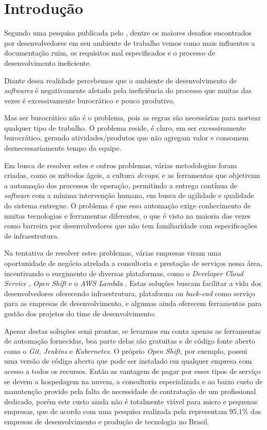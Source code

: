 \documentclass[
	12pt,				%
	openright,			%
	oneside,			%
	a4paper,			%
	english,			%
	french,				%
	spanish,			%
	brazil,				%
	]{abntex2}
\begin{document}
\chapter{Introdução}
Segundo uma pesquisa publicada pelo , dentre os maiores desafios encontrados por desenvolvedores em seu ambiente de trabalho vemos como mais influentes a documentação ruim, os requisitos mal especificados e o processo de desenvolvimento ineficiente.

Diante dessa realidade percebemos que o ambiente de desenvolvimento de \textit{softwares} é negativamente afetado pela ineficiência do processo que muitas das vezes é excessivamente burocrático e pouco produtivo.

\begin{citacao}
Mas ser burocrático não é o problema, pois as regras são necessárias para nortear qualquer tipo de trabalho. O problema reside, é claro, em ser excessivamente burocrático, gerando atividades/produtos que não agregam valor e consomem desnecessariamente tempo da equipe. \cite{EBusiness:ManifestoAgil}
\end{citacao}

Em busca de resolver estes e outros problemas, várias metodologias foram criadas, como os métodos ágeis, a cultura \textit{devops}, e as ferramentas que objetivam a automação dos processos de operação, permitindo a entrega contínua de \textit{software} com a mínima intervenção humana, em busca de agilidade e qualidade do sistema entregue. O problema é que essa automação exige conhecimento de muitas tecnologias e ferramentas diferentes, o que é visto na maioria das vezes como barreira por desenvolvedores que não tem familiaridade com especificações de infraestrutura.

Na tentativa de resolver estes problemas, várias empresas viram uma oportunidade de negócio atrelada a consultoria e prestação de serviços nessa área, incentivando o surgimento de diversas plataformas, como o \textit{Developer Cloud Service} \cite{Oracle:DevOps}, \textit{Open Shift} \cite{RedHat:OpenShift} e o \textit{AWS Lambda} \cite{Amazon:Lambda}. Estas soluções buscam facilitar a vida dos desenvolvedores oferecendo infraestrutura, plataforma ou \textit{back-end} como serviço para as empresas de desenvolvimento, e algumas ainda oferecem ferramentas para gestão dos projetos do time de desenvolvimento.

Apesar destas soluções semi prontas, se levarmos em conta apenas as ferramentas de automação fornecidas, boa parte delas são gratuitas e de código fonte aberto como o \textit{Git}, \textit{Jenkins} e \textit{Kubernetes}. O próprio \textit{Open Shift}, por exemplo, possui uma versão de código aberta que pode ser instalado em qualquer empresa com acesso a todos os recursos. Então as vantagem de pagar por esses tipos de serviço se devem a hospedagem na nuvem, a consultoria especializada e ao baixo custo de manutenção provido pela falta de necessidade de contratação de um profissional dedicado, porém este custo ainda não é totalmente viável para micro e pequenas empresas, que de acordo com uma pesquisa realizada pela  representam 95,1\% das empresas de desenvolvimento e produção de tecnologia no Brasil.
\end{document}
